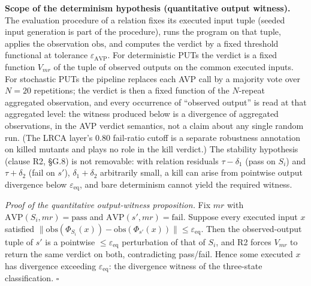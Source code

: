 \documentclass[review,12pt,authoryear]{elsarticle}
\begin{document}
\textbf{Scope of the determinism hypothesis (quantitative output
witness).} The
evaluation procedure of a relation fixes its executed input tuple
(seeded input generation is part of the procedure), runs the program on
that tuple, applies the observation $\mathrm{obs}$, and computes the
verdict by a fixed threshold functional at tolerance
$\varepsilon_{\mathrm{AVP}}$. For deterministic PUTs the verdict is a
fixed function $V_{mr}$ of the tuple of observed outputs on the common
executed inputs. For stochastic PUTs the pipeline replaces each AVP call
by a majority vote over $N = 20$ repetitions; the verdict is then a
fixed function of the $N$-repeat aggregated observation, and every
occurrence of ``observed output'' is read at that aggregated level: the
witness produced below is a divergence of aggregated observations, in
the AVP verdict semantics, not a claim about any single random run.
(The LRCA layer's 0.80 fail-ratio cutoff is a separate robustness
annotation on killed mutants and plays no role in the kill verdict.)
The stability hypothesis (clause R2, §G.8) is not removable: with
relation residuals $\tau - \delta_1$ (pass on $S_i$) and
$\tau + \delta_2$ (fail on $s'$), $\delta_1 + \delta_2$ arbitrarily
small, a kill can arise from pointwise output divergence below
$\varepsilon_{\mathrm{eq}}$, and bare determinism cannot yield the
required witness.

\emph{Proof of the quantitative output-witness proposition.} Fix $mr$ with
$\mathrm{AVP}(S_i, mr) = \mathrm{pass}$ and
$\mathrm{AVP}(s', mr) = \mathrm{fail}$. Suppose every executed input $x$
satisfied
$\|\mathrm{obs}(\Phi_{S_i}(x)) - \mathrm{obs}(\Phi_{s'}(x))\| \leq \varepsilon_{\mathrm{eq}}$.
Then the observed-output tuple of $s'$ is a pointwise
$\leq \varepsilon_{\mathrm{eq}}$ perturbation of that of $S_i$, and R2
forces $V_{mr}$ to return the same verdict on both, contradicting
pass/fail. Hence some executed $x$ has divergence exceeding
$\varepsilon_{\mathrm{eq}}$: the divergence witness of the three-state
classification. $\square$
\end{document}
